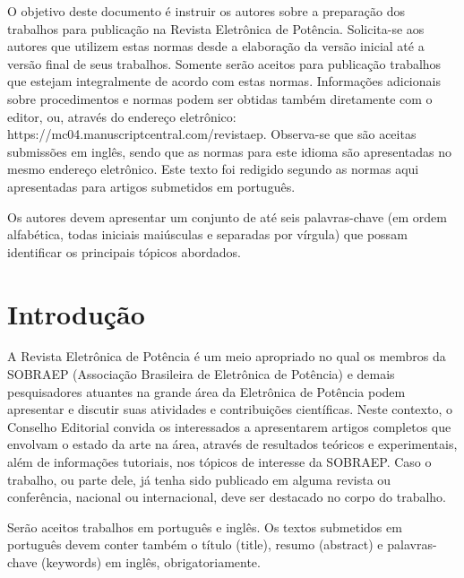 \documentclass[portugues]{sobraep}
\author{Caleb Martim, Gabriel Henrique, Guilherme da Rocha\\
	\normalsize Bacharelado em Ciência da Computação\\
	\normalsize Univerisdade de Brasília\\
	\normalsize e-mail: autor1@email.br, autor2@email.com
}
\begin{document}
\maketitle

\begin{resumo}
	O objetivo deste documento é instruir os autores sobre a preparação dos trabalhos para publicação na Revista Eletrônica de Potência. Solicita-se aos autores que utilizem estas normas desde a elaboração da versão inicial até a versão final de seus trabalhos. Somente serão aceitos para publicação trabalhos que estejam integralmente de acordo com estas normas. Informações adicionais sobre procedimentos e normas podem ser obtidas também diretamente com o editor, ou, através do endereço eletrônico: https://mc04.manuscriptcentral.com/revistaep. Observa-se que são aceitas submissões em inglês, sendo que as normas para este idioma são apresentadas no mesmo endereço eletrônico. Este texto foi redigido segundo as normas aqui apresentadas para artigos submetidos em português.
\end{resumo}

\begin{palavraschave }
	Os autores devem apresentar um conjunto de até seis palavras-chave (em ordem alfabética, todas iniciais maiúsculas e separadas por vírgula) que possam identificar os principais tópicos abordados.
\end{palavraschave }


\section{Introdução}

A Revista Eletrônica de Potência é um meio apropriado no qual os membros da SOBRAEP (Associação Brasileira de Eletrônica de Potência) e demais pesquisadores atuantes na grande área da Eletrônica de Potência podem apresentar e discutir suas atividades e contribuições científicas. Neste contexto, o Conselho Editorial convida os interessados a apresentarem artigos completos que envolvam o estado da arte na área, através de resultados teóricos e experimentais, além de informações tutoriais, nos tópicos de interesse da SOBRAEP. Caso o trabalho, ou parte dele, já tenha sido publicado em alguma revista ou conferência, nacional ou internacional, deve ser destacado no corpo do trabalho.

Serão aceitos trabalhos em português e inglês. Os textos submetidos em português devem conter também o título (title), resumo (abstract) e palavras-chave (keywords) em inglês, obrigatoriamente.
\end{document}
